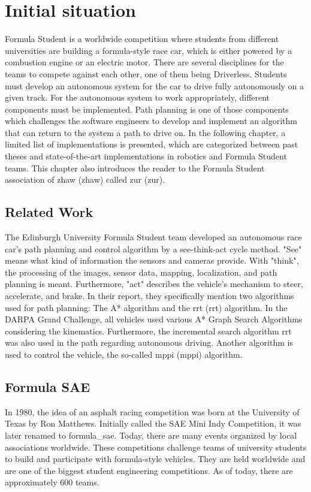 \section{Initial situation} \label{sec:Initial situation}
Formula Student is a worldwide competition where students from different universities are building a formula-style race car, which is either powered by a combustion engine or an electric motor. There are several disciplines for the teams to compete against each other, one of them being Driverless. Students must develop an autonomous system for the car to drive fully autonomously on a given track. For the autonomous system to work appropriately, different components must be implemented. Path planning is one of those components which challenges the software engineers to develop and implement an algorithm that can return to the system a path to drive on. In the following chapter, a limited list of implementations is presented, which are categorized between past theses and state-of-the-art implementations in robotics and Formula Student teams. This chapter also introduces the reader to the Formula Student association of \acrlong{zhaw} (\acrshort{zhaw}) called \acrlong{zur} (\acrshort{zur}).

\subsection{Related Work} \label{sec:Related Work}
The Edinburgh University Formula Student team developed an autonomous race car's path planning and control algorithm by a see-think-act cycle method. "See" means what kind of information the sensors and cameras provide. With "think", the processing of the images, sensor data, mapping, localization, and path planning is meant. Furthermore, "act" describes the vehicle's mechanism to steer, accelerate, and brake.
In their report, they specifically mention two algorithms used for path planning: The A* algorithm and the \acrlong{rrt} (\acrshort{rrt}) algorithm. In the DARPA Grand Challenge, all vehicles used various A* Graph Search Algorithms considering the kinematics. Furthermore, the incremental search algorithm \acrshort{rrt} was also used in the path regarding autonomous driving.
Another algorithm is used to control the vehicle, the so-called \acrlong{mppi} (\acrshort{mppi}) algorithm.
\cite{path_planning_and_control_georgiev} \cite{darpa_grand_challenge} %

\subsection{Formula SAE}
In 1980, the idea of an asphalt racing competition was born at the University of Texas by Ron Matthews. Initially called the SAE Mini Indy Competition, it was later renamed to \Gls{formula_sae}. Today, there are many events organized by local associations worldwide.
\cite{formula_sae}
These competitions challenge teams of university students to build and participate with formula-style vehicles. They are held worldwide and are one of the biggest student engineering competitions. As of today, there are approximately 600 teams. \cite{sae_student_events}

